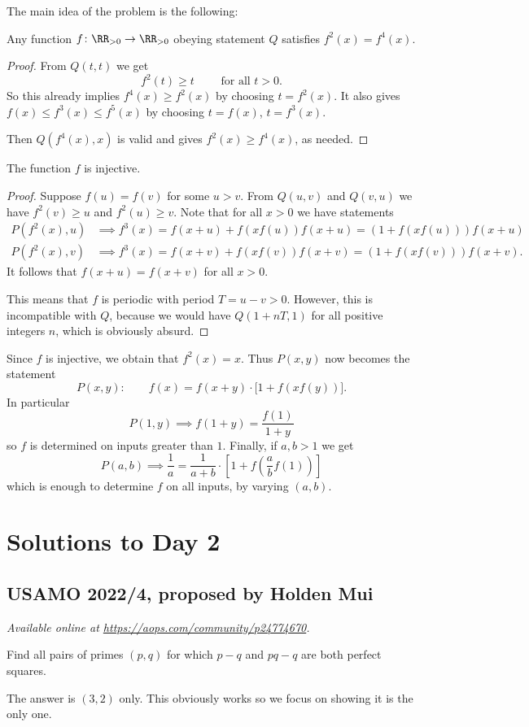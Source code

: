 \documentclass[11pt]{scrartcl}
\begin{document}
The main idea of the problem is the following:
\begin{claim*}
  Any function $f \colon \RR_{>0} \to \RR_{>0}$ obeying
  statement $Q$ satisfies $f^2(x) = f^4(x)$.
\end{claim*}
\begin{proof}
  From $Q(t,t)$ we get
  \[ f^2(t) \ge t \qquad \text{ for all } t > 0. \]
  So this already implies $f^4(x) \ge f^2(x)$ by choosing $t = f^2(x)$.
  It also gives $f(x) \le f^3(x) \le f^5(x)$
  by choosing $t = f(x)$, $t = f^3(x)$.

  Then $Q(f^4(x), x)$ is valid and gives $f^2(x) \ge f^4(x)$, as needed.
\end{proof}

\begin{claim*}
  The function $f$ is injective.
\end{claim*}
\begin{proof}
  Suppose $f(u) = f(v)$ for some $u > v$.
  From $Q(u,v)$ and $Q(v,u)$ we have $f^2(v) \ge u$ and $f^2(u) \ge v$.
  Note that for all $x > 0$ we have statements
  \begin{align*}
    P(f^2(x), u) &\implies f^3(x) = f(x+u) + f(xf(u)) f(x+u) = (1+f(xf(u)))f(x+u) \\
    P(f^2(x), v) &\implies f^3(x) = f(x+v) + f(xf(v)) f(x+v) = (1+f(xf(v)))f(x+v).
  \end{align*}
  It follows that $f(x+u) = f(x+v)$ for all $x > 0$.

  This means that $f$ is periodic with period $T = u-v > 0$.
  However, this is incompatible with $Q$,
  because we would have $Q(1+nT, 1)$ for all positive integers $n$,
  which is obviously absurd.
\end{proof}

Since $f$ is injective, we obtain that $f^2(x) = x$.
Thus $P(x,y)$ now becomes the statement
\[ P(x,y) : \qquad f(x) = f(x+y) \cdot \Big[ 1+f(xf(y)) \Big]. \]
In particular
\[ P(1,y) \implies f(1+y) = \frac{f(1)}{1+y} \]
so $f$ is determined on inputs greater than $1$.
Finally, if $a,b > 1$ we get
\[ P(a,b) \implies \frac 1a = \frac{1}{a+b} \cdot
  \left[ 1 + f\left( \frac ab f(1) \right) \right] \]
which is enough to determine $f$ on all inputs, by varying $(a,b)$.
\pagebreak

\section{Solutions to Day 2}
\subsection{USAMO 2022/4, proposed by Holden Mui}
\textsl{Available online at \url{https://aops.com/community/p24774670}.}
\begin{mdframed}[style=mdpurplebox,frametitle={Problem statement}]
Find all pairs of primes $(p, q)$ for which $p-q$ and $pq-q$ are both perfect squares.
\end{mdframed}
The answer is $(3,2)$ only.
This obviously works so we focus on showing it is the only one.
\end{document}
